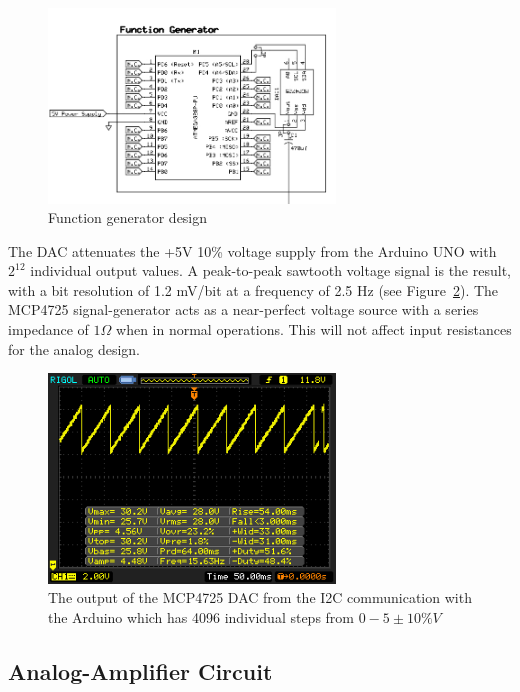 \documentclass[12pt,journal]{IEEEtran}
\begin{document}
\begin{figure}
	\centering
	\includegraphics[width=3in]{./Function_generator.png}
	\caption{Function generator design}
	\label{fig:function-generator}
\end{figure}

The DAC attenuates the +5V 10\% voltage supply from the Arduino UNO with $2^{12}$ individual output values. A peak-to-peak sawtooth voltage signal is the result, with a bit resolution of 1.2 mV/bit at a frequency of 2.5 Hz (see Figure~\ref{fig:five-volts-15-hz-wave}). The MCP4725 signal-generator acts as a near-perfect voltage source with a series impedance of $1\Omega$ when in normal operations. This will not affect input resistances for the analog design.  

\begin{figure}[h!]
  \centering
	\includegraphics[width=3in]{./data/dac-output-waveform.png}
	\caption[Cavity Mounts]{The output of the MCP4725 DAC from the I2C communication with the Arduino which has 4096 individual steps from $0-5 \pm 10\% V$}
	\label{fig:five-volts-15-hz-wave}
\end{figure}


\subsection{Analog-Amplifier Circuit}
\end{document}
